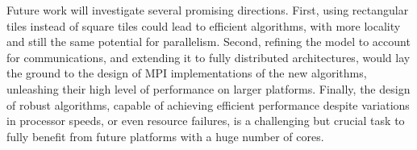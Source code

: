 \documentclass[a4paper,twopages]{article}
\begin{document}
Future work will investigate several promising directions. First, using rectangular tiles instead of square tiles
could lead to efficient algorithms, with more locality and still the same potential for parallelism. Second,
refining the model to account for communications, and extending it to fully distributed architectures, would lay the ground to the design of
MPI implementations of the new algorithms, unleashing their high level of performance on larger platforms.
Finally, the design of robust algorithms, capable of achieving efficient performance despite variations in processor speeds,
or even resource failures, is a challenging but crucial task to fully benefit from future platforms with a huge number of cores.



\end{document}
